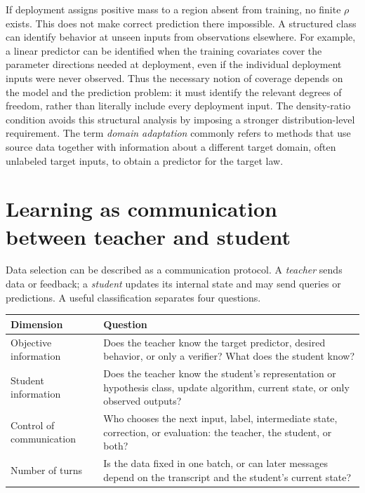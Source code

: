 \documentclass[11pt,twoside]{article}
\theoremstyle{definition}
\theoremstyle{remark}
\begin{document}
If deployment assigns positive mass to a region absent from training, no
finite $\rho$ exists. This does not make correct prediction there impossible.
A structured class can identify behavior at unseen inputs from observations
elsewhere. For example, a linear predictor can be identified when the training
covariates cover the parameter directions needed at deployment, even if the
individual deployment inputs were never observed. Thus the necessary notion
of coverage depends on the model and the prediction problem: it must identify
the relevant degrees of freedom, rather than literally include every
deployment input. The density-ratio condition avoids this structural analysis
by imposing a stronger distribution-level requirement.
The term \emph{domain adaptation} commonly refers to methods that use source
data together with information about a different target domain, often
unlabeled target inputs, to obtain a predictor for the target law.

\section{Learning as communication between teacher and student}
\label{sec:teacher-student}

Data selection can be described as a communication protocol. A
\emph{teacher} sends data or feedback; a \emph{student} updates its internal
state and may send queries or predictions. A useful classification separates
four questions.

\begin{center}
\begin{tabular}{p{}p{}}
\toprule
Dimension & Question \\
\midrule
Objective information & Does the teacher know the target predictor, desired
behavior, or only a verifier? What does the student know? \\
Student information & Does the teacher know the student's representation or
hypothesis class, update algorithm, current state, or only observed outputs? \\
Control of communication & Who chooses the next input, label, intermediate
state, correction, or evaluation: the teacher, the student, or both? \\
Number of turns & Is the data fixed in one batch, or can later messages depend
on the transcript and the student's current state? \\
\bottomrule
\end{tabular}
\end{center}
\end{document}
